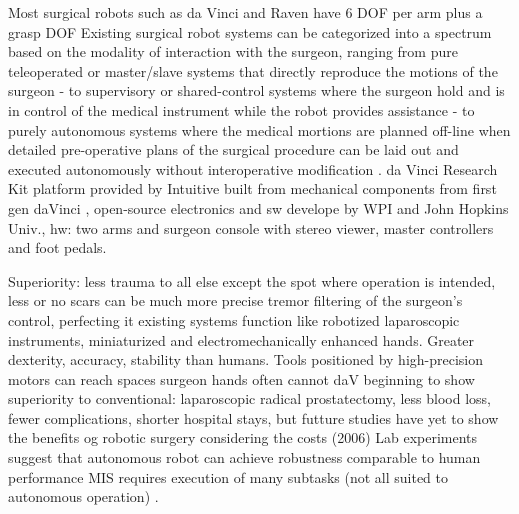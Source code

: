 Most surgical robots such as da Vinci and Raven have 6 DOF per arm plus a grasp DOF \citep{bib:raven_debride}
Existing surgical robot systems can be categorized into a spectrum based on the modality of interaction with the surgeon, ranging from pure teleoperated or master/slave systems that directly reproduce the motions of the surgeon - to supervisory or shared-control systems where the surgeon hold and is in control of the medical instrument while the robot provides assistance - to purely autonomous systems where the medical mortions are planned off-line when detailed pre-operative plans of the surgical procedure can be laid out and executed autonomously without interoperative modification \citep{bib:raven_debride}.
da Vinci Research Kit platform provided by Intuitive built from mechanical components from first gen daVinci \citep{bib:raven_observ}, open-source electronics and sw develope by WPI and John Hopkins Univ., hw: two arms and surgeon console with stereo viewer, master controllers and foot pedals.

Superiority:
less trauma to all else except the spot where operation is intended, less or no scars
can be much more precise
tremor filtering of the surgeon's control, perfecting it
existing systems function like robotized laparoscopic instruments, miniaturized and electromechanically enhanced hands. Greater dexterity, accuracy, stability than humans. Tools positioned by high-precision motors can reach spaces surgeon hands often cannot \citep{bib:docatadist}
daV beginning to show superiority to  conventional: laparoscopic radical prostatectomy, less blood loss, fewer complications, shorter hospital stays, but futture studies have yet to show the benefits og robotic surgery considering the costs (2006) \citep{bib:docatadist}
Lab experiments suggest that autonomous robot can achieve robustness comparable to human performance \citep{bib:raven_debride}
MIS requires execution of many subtasks (not all suited to autonomous operation) \citep{bib:raven_debride}.

